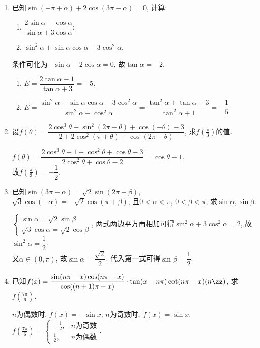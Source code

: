 \begin{enumerate}
\item 已知$\sin(-\pi+\alpha)+2\cos(3\pi-\alpha)=0$, 计算: 
\begin{enumerate}[(1)]
\item $\dfrac{2\sin\alpha-\cos\alpha}{\sin\alpha+3\cos\alpha}$; 
\item $\sin^2\alpha+\sin\alpha\cos\alpha-3\cos^2\alpha$. 
\end{enumerate}
\begin{jieda}
条件可化为$-\sin\alpha-2\cos\alpha=0$, 故$\tan\alpha=-2$. 
\begin{enumerate}[(1)]
\item $E=\dfrac{2\tan\alpha-1}{\tan\alpha+3}=-5$. 
\item $E=\dfrac{\sin^2\alpha+\sin\alpha\cos\alpha-3\cos^2\alpha}{\sin^2\alpha+\cos^2\alpha}=\dfrac{\tan^2\alpha+\tan\alpha-3}{\tan^2\alpha+1}=-\dfrac{1}{5}$
\end{enumerate}
\end{jieda}


\item 设$f(\theta)=\dfrac{2\cos^3\theta+\sin^2(2\pi-\theta)+\cos(-\theta)-3}{2+2\cos^2(\pi+\theta)+\cos(2\pi-\theta)}$, 求$f(\frac{\pi}{3})$的值. 
\begin{jieda}
$f(\theta)=\dfrac{2\cos^3\theta+1-\cos^2\theta+\cos\theta-3}{2\cos^2\theta+\cos\theta-2}=\cos\theta-1$. \\
故$f(\frac{\pi}{3})=-\dfrac{1}{2}$. 
\end{jieda}


\item 已知$\sin(3\pi-\alpha)=\sqrt2\sin(2\pi+\beta)$, $\sqrt3\cos(-\alpha)=-\sqrt2\cos(\pi+\beta)$, 
且$0<\alpha<\pi$, $0<\beta<\pi$, 求$\sin\alpha,\sin\beta$. 
\begin{jieda}
$\begin{cases}
\sin\alpha=\sqrt{2}\sin\beta\\
\sqrt{3}\cos\alpha=\sqrt{2}\cos\beta
\end{cases}$, 两式两边平方再相加可得$\sin^2\alpha+3\cos^2\alpha=2$, 故$\sin^2\alpha=\dfrac{1}{2}$. \\
又$\alpha\in(0,\pi)$, 故$\sin\alpha=\dfrac{\sqrt{2}}{2}$. 
代入第一式可得$\sin\beta=\dfrac{1}{2}$. 
\end{jieda}

\item 已知$f(x)=\dfrac{\sin(n\pi-x)\cos(n\pi-x)}{\cos((n+1)\pi-x)}\cdot\tan(x-n\pi)\cot(n\pi-x)(n\zz)$, 求$f(\frac{7\pi}{6})$. 
\begin{jieda}
$n$为偶数时, $f(x)=-\sin{x}$; $n$为奇数时, $f(x)=\sin{x}$. \\
$f(\frac{7\pi}{6})=\begin{cases}
-\frac{1}{2}, & n\text{为奇数}\\
\frac{1}{2}, & n\text{为偶数}
\end{cases}$. 
\end{jieda}

\end{enumerate}
